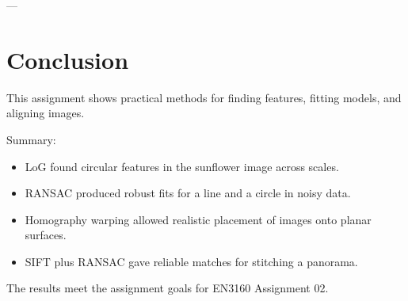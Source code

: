 \documentclass[11pt,a4paper]{article}
\begin{document}
---

\section{Conclusion}
This assignment shows practical methods for finding features, fitting models, and aligning images.

Summary:
\begin{itemize}
\item LoG found circular features in the sunflower image across scales.
\item RANSAC produced robust fits for a line and a circle in noisy data.
\item Homography warping allowed realistic placement of images onto planar surfaces.
\item SIFT plus RANSAC gave reliable matches for stitching a panorama.
\end{itemize}

The results meet the assignment goals for EN3160 Assignment 02.
\end{document}
